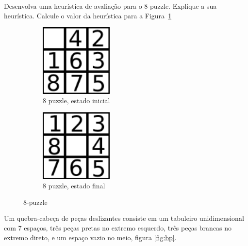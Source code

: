 \documentclass[12pt]{exam}
\begin{document}
\begin{questions}










\question Desenvolva uma heurística de avaliação para o 8-puzzle.
Explique a sua heurística. 
Calcule o valor da heurística para a Figura~\ref{fig:8p01}\\


\begin{figure}[h]
  \centering
  \begin{subfigure}[b]{0.48\textwidth}
  	\center
    \includegraphics[width=0.40\textwidth]{8p01}
    \caption{8 puzzle, estado inicial}
    \label{fig:8p01}
  \end{subfigure}
  \begin{subfigure}[b]{0.48\textwidth}
  	\center
    \includegraphics[width=0.40\textwidth]{8pfinal}
    \caption{8 puzzle, estado final}
    \label{fig:8pfinal}
  \end{subfigure}
  \caption{8-puzzle}\label{fig:8p}
\end{figure}






\question Um quebra-cabeça de peças deslizantes consiste em um tabuleiro unidimensional com 7 espaços, três peças pretas no extremo esquerdo, três peças brancas no extremo direto, e um espaço vazio no meio, figura \ref{fig:bp}.


\end{questions}
\end{document}
